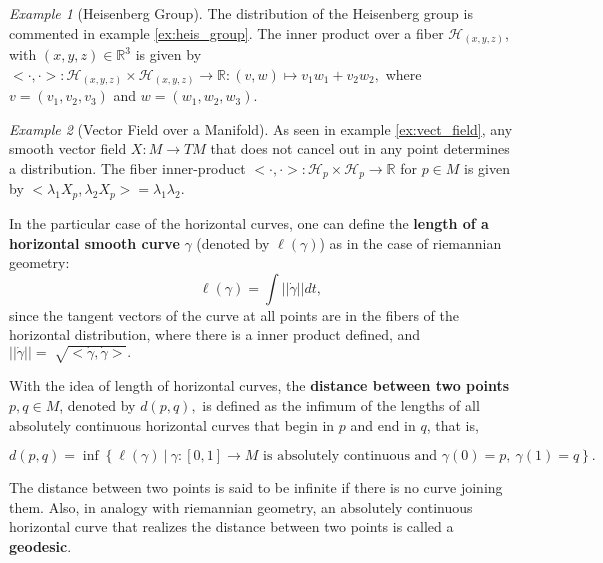 \documentclass[12pt, letterpaper, reqno]{amsart}
\theoremstyle{definition}
\theoremstyle{plain}
\theoremstyle{remark}
\newtheorem{ex}{Example}
\begin{document}
\begin{ex}[Heisenberg Group]\label{ex:heis_group2}
	The distribution of the Heisenberg group is commented in example \ref{ex:heis_group}. The inner product over a fiber $ \mathcal{H}_{(x,y,z)} $, with $ (x,y,z)\in \mathbb{R}^3 $  is given by $<\cdot,\cdot>:  \mathcal{H}_{(x,y,z)}\times\mathcal{H}_{(x,y,z)} \rightarrow { \mathbb{R} }:(v,w)\mapsto v_1w_1+v_2w_2,$ where $ v=(v_1,v_2,v_3) $ and $ w=(w_1,w_2,w_3). $  

\end{ex}
\begin{ex}[Vector Field over a Manifold]\label{ex:vect_field2}
	As seen in example \ref{ex:vect_field}, any smooth vector field $ X: M \rightarrow TM$ that does not cancel out in any point determines a distribution.  The fiber inner-product $ <\cdot,\cdot>: \mathcal{H}_p \times \mathcal{H}_p \rightarrow \mathbb{R} $ for $ p\in M $  is given by $<\lambda_1 X_p,\lambda_2 X_p>=\lambda_1 \lambda_2.$
\end{ex}
In the particular case of the horizontal curves, one can define the \textbf{length of a horizontal smooth curve} $ \gamma $ (denoted by $ \ell(\gamma) $) as in the case of riemannian geometry:
$$ \ell(\gamma) = \int ||\dot{\gamma}|| dt, $$ 
since the tangent vectors of the curve at all points are in the fibers of the horizontal distribution, where there is a inner product defined, and $ ||\dot{\gamma}||= \sqrt[]{<\dot{\gamma}, \dot{\gamma}>}.  $   

With the idea of length of horizontal curves, the \textbf{distance between two points} $ p,q\in M $, denoted by $ d(p,q), $   is defined as the infimum of the lengths of all absolutely continuous horizontal curves that begin in $ p $ and end in $ q $, that is, 

$$ d(p,q) = \operatorname{inf} \left\{ \ell(\gamma) \ |\ \gamma:[0,1] \rightarrow {M} \text{ is absolutely continuous and }\gamma(0)=p, \ \gamma(1)=q \right\}. $$ 

The distance between two points is said to be infinite if there is no curve joining them. Also, in analogy with riemannian geometry, an absolutely continuous horizontal curve that realizes the distance between two points is called a \textbf{geodesic}. 





\nocite{*}

\end{document}
